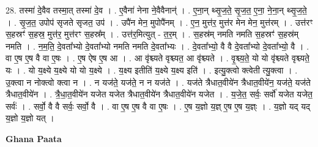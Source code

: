 \documentclass[17pt]{extarticle}
\begin{document}
28. तस्मा॑ दे॒वैव तस्मा॒त् तस्मा॑ दे॒व । . ए॒वैना॑ नेना ने॒वैवैनान्॑ । . ए॒ना॒न् थ्सृ॒ज॒ते॒ सृ॒ज॒त॒ ए॒ना॒ ने॒ना॒न् थ्सृ॒ज॒ते॒ । . सृ॒ज॒त॒ उपोप॑ सृजते सृजत॒ उप॑ । . उपै॑न मेन॒ मुपोपै॑नम् । . ए॒न॒ मुत्त॑र॒ मुत्त॑र मेन मेन॒ मुत्त॑रम् । . उत्त॑रꣳ स॒हस्रꣳ॑ स॒हस्र॒ मुत्त॑र॒ मुत्त॑रꣳ स॒हस्र᳚म् । . उत्त॑र॒मित्युत् - त॒र॒म् । . स॒हस्र॑म् नमति नमति स॒हस्रꣳ॑ स॒हस्र॑म् नमति । . न॒म॒ति॒ दे॒वता᳚भ्यो दे॒वता᳚भ्यो नमति नमति दे॒वता᳚भ्यः । . दे॒वता᳚भ्यो॒ वै वै दे॒वता᳚भ्यो दे॒वता᳚भ्यो॒ वै । . वा ए॒ष ए॒ष वै वा ए॒षः । . ए॒ष ऐष ए॒ष आ । . आ वृ॑श्च्यते वृश्च्यत॒ आ वृ॑श्च्यते । . वृ॒श्च्य॒ते॒ यो यो वृ॑श्च्यते वृश्च्यते॒ यः । . यो य॒क्ष्ये य॒क्ष्ये यो यो य॒क्ष्ये । . य॒क्ष्य इतीति॑ य॒क्ष्ये य॒क्ष्य इति॑ । . इत्यु॒क्त्वो क्त्वेती त्यु॒क्त्वा । . उ॒क्त्वा न नोक्त्वो क्त्वा न । . न यज॑ते॒ यज॑ते॒ न न यज॑ते । . यज॑ते त्रैधात॒वीये॑न त्रैधात॒वीये॑न॒ यज॑ते॒ यज॑ते त्रैधात॒वीये॑न । . त्रै॒धा॒त॒वीये॑न यजेत यजेत त्रैधात॒वीये॑न त्रैधात॒वीये॑न यजेत । . य॒जे॒त॒ सर्वः॒ सर्वो॑ यजेत यजेत॒ सर्वः॑ । . सर्वो॒ वै वै सर्वः॒ सर्वो॒ वै । . वा ए॒ष ए॒ष वै वा ए॒षः । . ए॒ष य॒ज्ञो य॒ज्ञ् ए॒ष ए॒ष य॒ज्ञ्ः । . य॒ज्ञो यद् यद् य॒ज्ञो य॒ज्ञो यत् । \newline

\textbf{Ghana Paata } \newline
\end{document}
